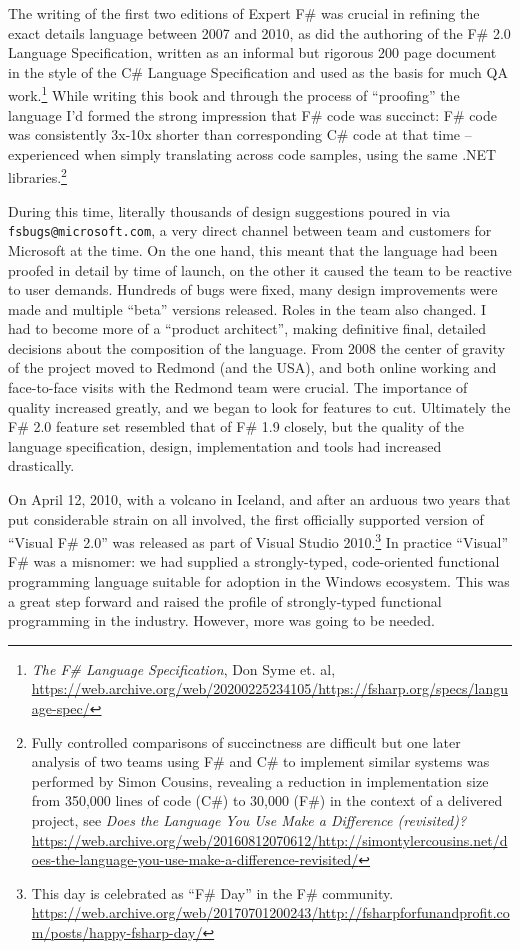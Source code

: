 \documentclass[acmsmall]{acmart}\settopmatter{}
\begin{document}
The writing of the first two editions of Expert F\# was crucial in refining the exact details language between 2007 and 2010, as did the
authoring of the F\# 2.0 Language Specification, written as an informal but rigorous 200 page document in
the style of the C\# Language Specification and used as the basis for much QA work.\footnote{\textit{The F\# Language Specification}, Don Syme et. al, \url{https://web.archive.org/web/20200225234105/https://fsharp.org/specs/language-spec/}}
While writing this book and through the process of ``proofing'' the language I'd formed the strong impression that F\# code was succinct: F\# code was consistently
3x-10x shorter than corresponding C\# code at that time -- experienced when simply translating across code samples, using the same .NET libraries.\footnote{Fully
controlled comparisons of succinctness are difficult but one later analysis of two teams using F\# and C\# to implement similar systems was performed
by Simon Cousins, revealing a reduction in implementation size from 350,000 lines of code (C\#) to 30,000 (F\#) in the context of a delivered
project, see \textit{Does the Language You Use Make a Difference (revisited)?} \url{https://web.archive.org/web/20160812070612/http://simontylercousins.net/does-the-language-you-use-make-a-difference-revisited/}}


During this time, literally thousands of design suggestions poured in via \texttt{fsbugs@microsoft.com}, a very direct channel between team and
customers for Microsoft at the time. On the one hand, this meant that the language had been proofed in detail by time of launch, on the
other it caused the team to be reactive to user demands.  Hundreds of bugs were fixed, many design improvements were made and
multiple “beta” versions released.  Roles in the team also changed.  I had to become more of a “product architect”, making
definitive final, detailed decisions about the composition of the language.  From 2008 the center of gravity of the project moved to
Redmond (and the USA), and both online working and face-to-face visits with the Redmond team were crucial.  The importance of
quality increased greatly, and we began to look for features to cut.  Ultimately the F\# 2.0 feature set resembled that of F\# 1.9 closely,
but the quality of the language specification, design, implementation and tools had increased drastically.

On April 12, 2010, with a volcano in Iceland, and after an arduous two years that put considerable strain on all involved, the first officially
supported version of “Visual F\# 2.0” was released as part of Visual Studio
2010.\footnote{This day is celebrated as “F\# Day” in the F\# community. \url{https://web.archive.org/web/20170701200243/http://fsharpforfunandprofit.com/posts/happy-fsharp-day/}}
In practice “Visual” F\# was a misnomer: we had supplied a strongly-typed, code-oriented functional programming language
suitable for adoption in the Windows ecosystem.  This was a great step forward and raised the profile of strongly-typed functional
programming in the industry. However, more was going to be needed. 
\end{document}
